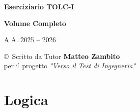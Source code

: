 \documentclass[20pt, a4paper]{article}
\begin{document}
\begin{titlepage}
    \centering
    \vspace*{2cm}
    {\Huge \textbf{Eserciziario TOLC-I} \par}
    \vspace{1cm}
    {\Large \textbf{Volume Completo} \par}
    \vspace{4cm}
    {\Large A.A. 2025 -- 2026 \par}
    \vspace{4cm}
    \vfill
    {\large \copyright \ Scritto da Tutor \textbf{Matteo Zambito} \\
    per il progetto \textit{"Verso il Test di Ingegneria"} \par}
\end{titlepage}

\newpage
\tableofcontents
\newpage

\section{Logica}
\end{document}

